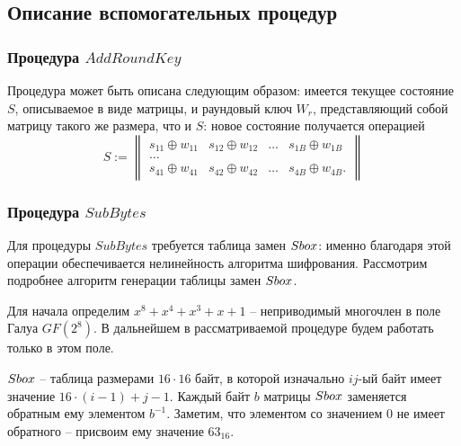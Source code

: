 \subsection{Описание вспомогательных процедур}

\subsubsection{Процедура $AddRoundKey$} \label{AddRoundKey}

    Процедура может быть описана следующим образом: имеется текущее состояние $S$, описываемое в виде матрицы, и
    раундовый ключ $W_{r}$, представляющий собой матрицу такого же размера, что и $S$: новое состояние получается операцией
    \begin{equation}
        S :=
        \begin{Vmatrix}
            s_{11} \oplus w_{11} & s_{12} \oplus w_{12} & \dots & s_{1B} \oplus w_{1B} \\
            \dots \\
            s_{41} \oplus w_{41} & s_{42} \oplus w_{42} & \dots & s_{4B} \oplus w_{4B}.
        \end{Vmatrix}
    \end{equation}

\subsubsection{Процедура $SubBytes$} \label{SubBytes}

    Для процедуры $SubBytes$ требуется таблица замен $S\-box$: именно благодаря этой операции обеспечивается
    нелинейность алгоритма шифрования. Рассмотрим подробнее алгоритм генерации таблицы замен $S\-box$.

    Для начала определим $x^8 + x^4 + x^3 + x + 1$ -- неприводимый многочлен в поле Галуа $GF(2^8)$.
    В дальнейшем в рассматриваемой процедуре будем работать только в этом поле.

    $S\-box$ -- таблица размерами $16 \cdot 16$ байт, в которой изначально $ij$-ый байт имеет значение $16 \cdot (i - 1) + j - 1$.
    Каждый байт $b$ матрицы $S\-box$ заменяется обратным ему элементом $b^{-1}$. Заметим, что элементом
    со значением 0 не имеет обратного -- присвоим ему значение $63_{16}$.

